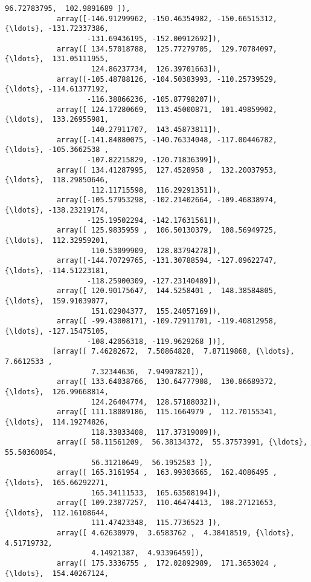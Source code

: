 \documentclass[11pt]{article}
\begin{document}
\begin{Verbatim}[commandchars=\\\{\}]
                     96.72783795,  102.9891689 ]),
            array([-146.91299962, -150.46354982, -150.66515312, {\ldots}, -131.72337386,
                   -131.69436195, -152.00912692]),
            array([ 134.57018788,  125.77279705,  129.70784097, {\ldots},  131.05111955,
                    124.86237734,  126.39701663]),
            array([-105.48788126, -104.50383993, -110.25739529, {\ldots}, -114.61377192,
                   -116.38866236, -105.87798207]),
            array([ 124.17280669,  113.45000871,  101.49859902, {\ldots},  133.26955981,
                    140.27911707,  143.45873811]),
            array([-141.84880075, -140.76334048, -117.00446782, {\ldots}, -105.3662538 ,
                   -107.82215829, -120.71836399]),
            array([ 134.41287995,  127.4528958 ,  132.20037953, {\ldots},  118.29850646,
                    112.11715598,  116.29291351]),
            array([-105.57953298, -102.21402664, -109.46838974, {\ldots}, -138.23219174,
                   -125.19502294, -142.17631561]),
            array([ 125.9835959 ,  106.50130379,  108.56949725, {\ldots},  112.32959201,
                    110.53099909,  128.83794278]),
            array([-144.70729765, -131.30788594, -127.09622747, {\ldots}, -114.51223181,
                   -118.25900309, -127.23140489]),
            array([ 120.90175647,  144.5258401 ,  148.38584805, {\ldots},  159.91039077,
                    151.02904377,  155.24057169]),
            array([ -99.43008171, -109.72911701, -119.40812958, {\ldots}, -127.15475105,
                   -108.42056318, -119.9629268 ])],
           [array([ 7.46282672,  7.50864828,  7.87119868, {\ldots},  7.6612533 ,
                    7.32344636,  7.94907821]),
            array([ 133.64038766,  130.64777908,  130.86689372, {\ldots},  126.99668814,
                    124.26404774,  128.57188032]),
            array([ 111.18089186,  115.1664979 ,  112.70155341, {\ldots},  114.19274826,
                    118.33833408,  117.37319009]),
            array([ 58.11561209,  56.38134372,  55.37573991, {\ldots},  55.50360054,
                    56.31210649,  56.1952583 ]),
            array([ 165.3161954 ,  163.99303665,  162.4086495 , {\ldots},  165.66292271,
                    165.34111533,  165.63508194]),
            array([ 109.23877257,  110.46474413,  108.27121653, {\ldots},  112.16108644,
                    111.47423348,  115.7736523 ]),
            array([ 4.62630979,  3.6583762 ,  4.38418519, {\ldots},  4.51719732,
                    4.14921387,  4.93396459]),
            array([ 175.3336755 ,  172.02892989,  171.3653024 , {\ldots},  154.40267124,

\end{Verbatim}
\end{document}
